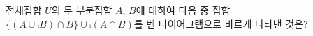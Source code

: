 전체집합 $U$의 두 부분집합 $A$, $B$에 대하여 다음 중 집합 $\{(A\cup\comp{B})\cap B\}\cup\comp{(A\cap B)}$를 벤 다이어그램으로 바르게 나타낸 것은?
\begin{choicesii}{}{}{}{}{}\end{choicesii}
